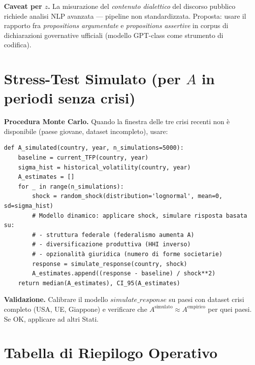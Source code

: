 \Conj{} \textbf{Caveat per \(z\).} La misurazione del \emph{contenuto
dialettico} del discorso pubblico richiede analisi NLP avanzata ---
pipeline non standardizzata. Proposta: usare il rapporto fra
\emph{propositions argumentate} e \emph{propositions assertive} in
corpus di dichiarazioni governative ufficiali (modello GPT-class come
strumento di codifica).



\section{\texorpdfstring{Stress-Test Simulato (per \(A\) in periodi
senza
crisi)}{Stress-Test Simulato (per A in periodi senza crisi)}}\label{stress-test-simulato-per-a-in-periodi-senza-crisi}

\Hypoth{} \textbf{Procedura Monte Carlo.} Quando la finestra delle tre
crisi recenti non è disponibile (paese giovane, dataset incompleto),
usare:

\begin{verbatim}
def A_simulated(country, year, n_simulations=5000):
    baseline = current_TFP(country, year)
    sigma_hist = historical_volatility(country, year)
    A_estimates = []
    for _ in range(n_simulations):
        shock = random_shock(distribution='lognormal', mean=0, sd=sigma_hist)
        # Modello dinamico: applicare shock, simulare risposta basata su:
        # - struttura federale (federalismo aumenta A)
        # - diversificazione produttiva (HHI inverso)
        # - opzionalità giuridica (numero di forme societarie)
        response = simulate_response(country, shock)
        A_estimates.append((response - baseline) / shock**2)
    return median(A_estimates), CI_95(A_estimates)
\end{verbatim}

\Proved{} \textbf{Validazione.} Calibrare il modello
\(simulate\_response\) su paesi con dataset crisi completo (USA, UE,
Giappone) e verificare che
\(A^{\text{simulato}} \approx A^{\text{empirico}}\) per quei paesi. Se
OK, applicare ad altri Stati.



\section{Tabella di Riepilogo
Operativo}\label{tabella-di-riepilogo-operativo}

